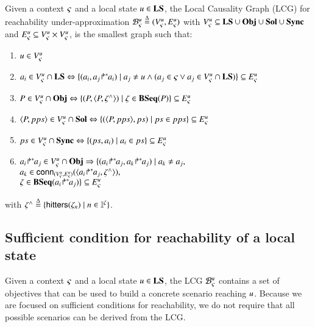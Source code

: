 \begin{definition}
\label{def:lcg}
Given a context $\varsigma$ and a local state $u\in \mathbf{LS}$,
the Local Causality Graph (LCG) for reachability under-approximation
${\mathcal{B}_{\varsigma}^{u}} \stackrel{\Delta}= ({V_\varsigma^u}, {E_\varsigma^u})$
with
${V_\varsigma^u} \subseteq \mathbf{LS} \cup \mathbf{Obj} \cup \mathbf{Sol} \cup \mathbf{Sync}$
and
${E_\varsigma^u} \subseteq {V_\varsigma^u} \times {V_\varsigma^u}$,
is the smallest graph such that:
\begin{enumerate}
\item
$u \in {V_\varsigma^u}$
\item
$a_i\in{V_\varsigma^u}\cap\mathbf{LS} \Leftrightarrow \{ (a_i,{a_j\!\Rsh^*\!\!a_i}) \mid
a_j \neq u \wedge (a_j\in\varsigma \vee a_j\in{V_\varsigma^u}\cap\mathbf{LS})
\}\subseteq{E_\varsigma^u}$
\label{lcg-ls-obj}
\item
$P\in{V_\varsigma^u}\cap\mathbf{Obj} \Leftrightarrow 
	\{ (P,\langle P,\zeta^\wedge\rangle) \mid \zeta\in\mathbf{BSeq}(P) \}\subseteq{E_\varsigma^u}$
\label{lcg-obj-sol}
\item
$\langle P, pps \rangle\in{V_\varsigma^u}\cap\mathbf{Sol} \Leftrightarrow
	\{ (\langle P,pps\rangle, ps) \mid ps\in pps \}\subseteq{E_\varsigma^u}$
\label{lcg-sol-sync}
\item
$ps \in{V_\varsigma^u}\cap\mathbf{Sync} \Leftrightarrow
	\{ (ps, a_i) \mid a_i\in ps \}\subseteq{E_\varsigma^u}$
\label{lcg-sync-ls}
\item
$\obj{a_i}{a_j}\in \cwBNodes\cap\Obj \Rightarrow 
	\{(\obj{a_i}{a_j},\obj{a_k}{a_j}) \mid a_k\neq a_j,$
\label{lcg-conn}
\\
\hspace*{4cm}
$a_k\in \mathsf{conn}_{({V_\varsigma^u},{E_\varsigma^u})}(\langle{a_i\!\Rsh^*\!\!a_j},\zeta^\wedge\rangle),$
\\
\hspace*{4cm}
$\zeta\in\mathbf{BSeq}({a_i\!\Rsh^*\!\!a_j}) \}\subseteq{E_\varsigma^u}$
\end{enumerate}
with $\zeta^\wedge \stackrel{\Delta}= \{\mathsf{hitters}(\zeta_n) \mid n\in\mathbb{I}^{\zeta} \}$.
\end{definition}



\subsection{Sufficient condition for reachability of a local state}
\label{ssec:ua}

Given a context $\varsigma$ and a local state $u\in\mathbf{LS}$, the LCG ${\mathcal{B}_{\varsigma}^{u}}$ contains a set of objectives
that can be used to build a concrete scenario reaching $u$.
Because we are focused on sufficient conditions for reachability, we do not require that all
possible scenarios can be derived from the LCG.

